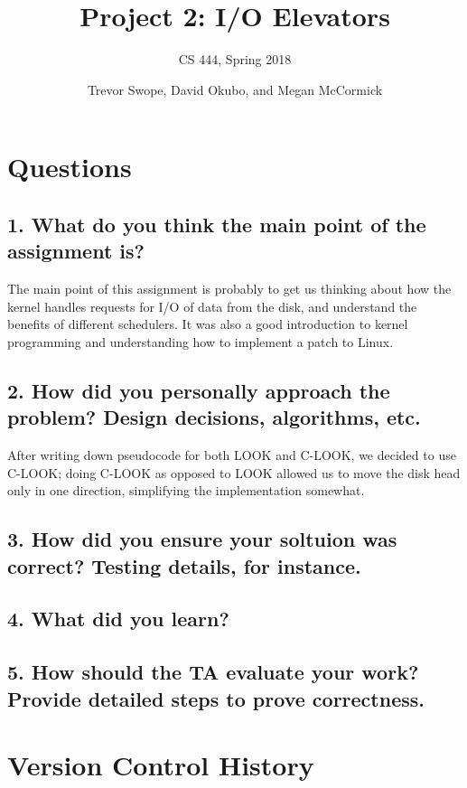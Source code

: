 \documentclass[letterpaper,10pt]{article}
\title{Project 2: I/O Elevators}
\subtitle{CS 444, Spring 2018}
\author{Trevor Swope, David Okubo, and Megan McCormick}
\begin{document}
\begin{titlingpage}
\maketitle 
\begin{abstract}

\end{abstract}
\end{titlingpage}
\section{Questions}
\subsection{1. What do you think the main point of the assignment is?}
The main point of this assignment is probably to get us thinking about how the kernel handles requests for I/O of data from the disk, and understand the benefits of different schedulers. It was also a good introduction to kernel programming and understanding how to implement a patch to Linux.

\subsection{2. How did you personally approach the problem? Design decisions, algorithms, etc.}
After writing down pseudocode for both LOOK and C-LOOK, we decided to use C-LOOK; doing C-LOOK as opposed to LOOK allowed us to move the disk head only in one direction, simplifying the implementation somewhat.

\subsection{3. How did you ensure your soltuion was correct? Testing details, for instance.}

\subsection{4. What did you learn?}

\subsection{5. How should the TA evaluate your work? Provide detailed steps to prove correctness.}

\section{Version Control History}


\nocite{*}


\end{document}
